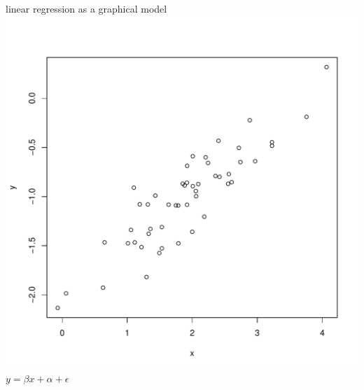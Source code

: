 \documentclass[mathserif]{beamer}
\begin{document}
\begin{frame}
    \small
    \begin{center}
    \alert{linear regression as a graphical model}\\
    \includegraphics[scale=0.4]{figures/linear_regression.pdf}\\
    \smallskip
    $y = \beta x + \alpha + \epsilon$\\
    \end{center}
\end{frame}
\end{document}
